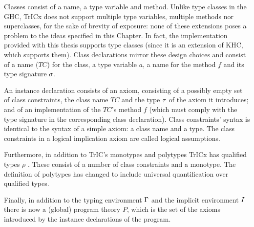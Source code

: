 Classes consist of a name, a type variable and method. Unlike type classes in the GHC, TrICx does not support multiple type variables, multiple methods nor superclasses, for the sake of brevity of exposure: none of these extensions poses a problem to the ideas specified in this Chapter. In fact, the implementation provided with this thesis supports type classes (since it is an extension of KHC, which supports them). Class declarations mirror these design choices and consist of a name ($TC$) for the class, a type variable $a$, a name for the method $f$ and its type signature $\mathit{\sigma}$.

An instance declaration consists of an axiom, consisting of a possibly empty set of class constraints, the class name $TC$ and the type $\mathit{\tau}$ of the axiom it introduces; and of an implementation of the $TC$'s method $f$ (which must comply with the type signature in the corresponding class declaration). Class constraints' syntax is identical to the syntax of a simple axiom: a class name and a type. The class constraints in a logical implication axiom are called logical assumptions.

Furthermore, in addition to TrIC's monotypes and polytypes TrICx has qualified types $\rho$ \cite{qualified, qual2}. These consist of a number of class constraints and a monotype. The definition of polytypes has changed to include universal quantification over qualified types.

Finally, in addition to the typing environment $\Gamma$ and the implicit environment $I$ there is now a (global) program theory $P$, which is the set of the axioms introduced by the instance declarations of the program.

